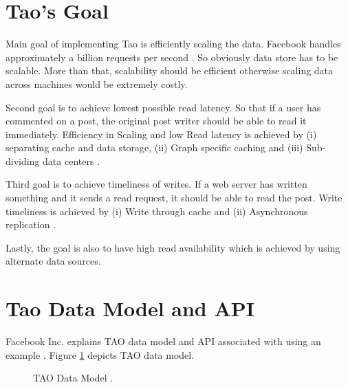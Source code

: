 \documentclass[9pt,twocolumn,twoside]{../../styles/osajnl}
\begin{document}
\section{Tao's Goal}
Main goal of implementing Tao is efficiently scaling the data. Facebook handles approximately a billion requests per second \cite{www-tao4}. So obviously data store has to be scalable. More than that, scalability should be efficient otherwise scaling data across machines would be extremely costly. 

Second goal is to achieve lowest possible read latency. So that if a user has commented on a post, the original post writer should be able to read it immediately.
Efficiency in Scaling and low Read latency is achieved by (i) separating cache and data storage, (ii) Graph specific caching and (iii) Sub-dividing data centers \cite{www-tao4}.

Third goal is to achieve timeliness of writes. If a web server has written something and it sends a read request, it should be able to read the post. Write timeliness is achieved by (i) Write through cache and (ii) Asynchronous replication \cite{www-tao4}.

Lastly, the goal is also to have high read availability which is achieved by using alternate data sources.

\section{Tao Data Model and API}
Facebook Inc. explains TAO data model and API associated with using an example \cite{www-tao2}. Figure \ref{fig:figure1} depicts TAO data model.

\begin{figure}[htbp]
\centering
{}
\caption{TAO Data Model \cite{www-tao2}.}
\label{fig:figure1}
\end{figure}
\end{document}
